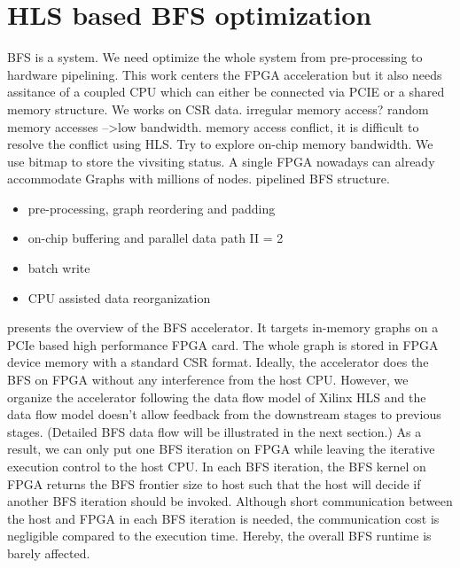 \section{HLS based BFS optimization} \label{sec:bfs-opt}
BFS is a system.
We need optimize the whole system from pre-processing to hardware pipelining.
This work centers the FPGA acceleration but it also needs assitance of a coupled CPU 
which can either be connected via PCIE or a shared memory structure.
We works on CSR data. irregular memory access? random memory accesses -->low bandwidth.
 memory access conflict, it is difficult to resolve the conflict using HLS. 
Try to explore on-chip memory bandwidth. We use bitmap to store the vivsiting status.
A single FPGA nowadays can already accommodate Graphs with millions of nodes.
pipelined BFS structure.

\begin{itemize}
\item pre-processing, graph reordering and padding
\item on-chip buffering and parallel data path II = 2
\item batch write
\item CPU assisted data reorganization
\end{itemize}

presents the overview of 
the BFS accelerator. It targets in-memory graphs on a PCIe based 
high performance FPGA card. The whole graph is stored in FPGA device 
memory with a standard CSR format. 
Ideally, the accelerator does the BFS on FPGA without 
any interference from the host CPU. However, we organize the accelerator 
following the data flow model of Xilinx HLS and the data flow model 
doesn't allow feedback from the downstream stages to previous stages.
(Detailed BFS data flow will be illustrated in the next section.)
As a result, we can only put one BFS iteration on FPGA while 
leaving the iterative execution control to the host CPU. In each BFS iteration, 
the BFS kernel on FPGA returns the BFS frontier size to host such that the host will 
decide if another BFS iteration should be invoked. Although short communication 
between the host and FPGA in each BFS iteration is needed, the communication cost 
is negligible compared to the execution time. Hereby, 
the overall BFS runtime is barely affected.

